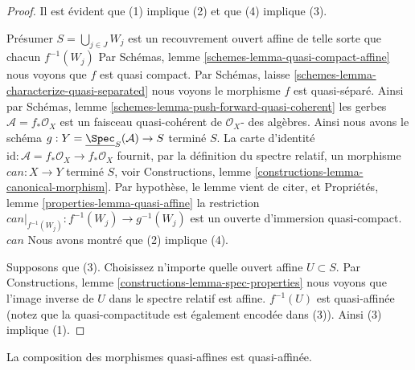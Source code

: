\begin{proof}
Il est évident que (1) implique (2) et que (4) implique (3).

\medskip\noindent

Présumer $S = \bigcup_{j \in J} W_j$ est un recouvrement ouvert affine de telle sorte que chacun $f^{-1}(W_j)$ Par Schémas, lemme \ref{schemes-lemma-quasi-compact-affine} nous voyons que $f$ est quasi compact. Par Schémas, laisse \ref{schemes-lemma-characterize-quasi-separated}
nous voyons le morphisme $f$ est quasi-séparé. Ainsi par Schémas, lemme \ref{schemes-lemma-push-forward-quasi-coherent} les gerbes $\mathcal{A} = f_*\mathcal{O}_X$ est un faisceau quasi-cohérent de $\mathcal{O}_X$- des algèbres. Ainsi nous avons le schéma
$g : Y = \underline{\Spec}_S(\mathcal{A}) \to S$ terminé $S$. La carte d'identité
$\text{id} : \mathcal{A} = f_*\mathcal{O}_X \to f_*\mathcal{O}_X$
fournit, par la définition du spectre relatif, un morphisme $can : X \to Y$ terminé $S$, voir Constructions, lemme \ref{constructions-lemma-canonical-morphism}. Par hypothèse, le lemme vient de citer, et Propriétés, lemme \ref{properties-lemma-quasi-affine}
la restriction $can|_{f^{-1}(W_j)} : f^{-1}(W_j) \to g^{-1}(W_j)$
est un ouverte d'immersion quasi-compact. $can$ Nous avons montré que (2) implique (4).

\medskip\noindent

Supposons que (3). Choisissez n'importe quelle ouvert affine $U \subset S$. Par Constructions, lemme \ref{constructions-lemma-spec-properties}
nous voyons que l'image inverse de $U$ dans le spectre relatif est affine. $f^{-1}(U)$ est quasi-affinée (notez que la quasi-compactitude est également encodée dans (3)). Ainsi (3) implique (1).

\end{proof}

\begin{lemma}

\label{lemma-composition-quasi-affine}

La composition des morphismes quasi-affines est quasi-affinée.

\end{lemma}

